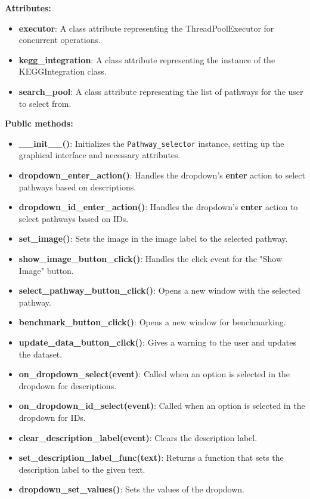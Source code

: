 \textbf{Attributes:}

\begin{itemize}
    \item \textbf{executor}: A class attribute representing the ThreadPoolExecutor for concurrent operations.
    \item \textbf{kegg\_integration}: A class attribute representing the instance of the KEGGIntegration class.
    \item \textbf{search\_pool}: A class attribute representing the list of pathways for the user to select from.
\end{itemize}

\textbf{Public methods:}

\begin{itemize}
    \item \textbf{\_\_init\_\_()}: Initializes the \texttt{Pathway\_selector} instance, setting up the graphical interface and necessary attributes.
    \item \textbf{dropdown\_enter\_action()}: Handles the dropdown's \textbf{enter} action to select pathways based on descriptions.
    \item \textbf{dropdown\_id\_enter\_action()}: Handles the dropdown's \textbf{enter} action to select pathways based on IDs.
    \item \textbf{set\_image()}: Sets the image in the image label to the selected pathway.
    \item \textbf{show\_image\_button\_click()}: Handles the click event for the "Show Image" button.
    \item \textbf{select\_pathway\_button\_click()}: Opens a new window with the selected pathway.
    \item \textbf{benchmark\_button\_click()}: Opens a new window for benchmarking.
    \item \textbf{update\_data\_button\_click()}: Gives a warning to the user and updates the dataset.
    \item \textbf{on\_dropdown\_select(event)}: Called when an option is selected in the dropdown for descriptions.
    \item \textbf{on\_dropdown\_id\_select(event)}: Called when an option is selected in the dropdown for IDs.
    \item \textbf{clear\_description\_label(event)}: Clears the description label.
    \item \textbf{set\_description\_label\_func(text)}: Returns a function that sets the description label to the given text.
    \item \textbf{dropdown\_set\_values()}: Sets the values of the dropdown.
\end{itemize}

